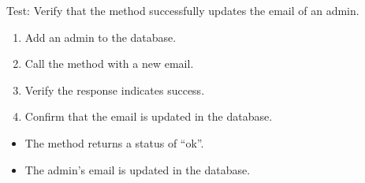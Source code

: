 \documentclass[letterpaper,10pt,english]{sphinxmanual}
\begin{document}
\begin{fulllineitems}
\label{\detokenize{test:test.test_admin.test_update_admin_email_success}}
\pysigstartsignatures
\pysiglinewithargsret
{}
{}
{}
\pysigstopsignatures
\sphinxAtStartPar
Test: Verify that the method successfully updates the email of an admin.
\begin{description}
\begin{enumerate}
%
\item {} 
\sphinxAtStartPar
Add an admin to the database.

\item {} 
\sphinxAtStartPar
Call the  method with a new email.

\item {} 
\sphinxAtStartPar
Verify the response indicates success.

\item {} 
\sphinxAtStartPar
Confirm that the email is updated in the database.

\end{enumerate}

\begin{itemize}
\item {} 
\sphinxAtStartPar
The method returns a status of “ok”.

\item {} 
\sphinxAtStartPar
The admin’s email is updated in the database.

\end{itemize}

\end{description}

\end{fulllineitems}

\end{document}
